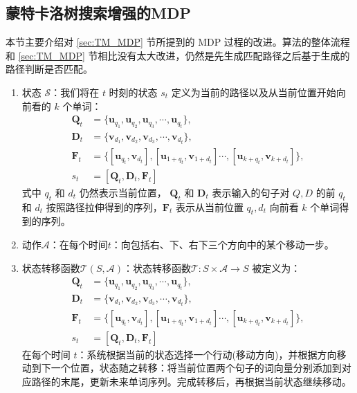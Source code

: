 \subsection{蒙特卡洛树搜索增强的MDP}
本节主要介绍对 \ref{sec:TM_MDP} 节所提到的 MDP 过程的改进。算法的整体流程和 \ref{sec:TM_MDP} 节相比没有太大改进，仍然是先生成匹配路径之后基于生成的路径判断是否匹配。
\begin{enumerate}
	\item 状态 $\mathcal{S}$：我们将在 $t$ 时刻的状态 $s_t$ 定义为当前的路径以及从当前位置开始向前看的 $k$ 个单词：
\begin{equation}
\label{eq:MCTS_state}
\begin{aligned}
\mathbf{Q}_t &= \{\mathbf{u}_{q_1}, \mathbf{u}_{q_2}, \mathbf{u}_{q_3}, \cdots, \mathbf{u}_{q_t}\},\\
\mathbf{D}_t &= \{\mathbf{v}_{d_1}, \mathbf{v}_{d_2}, \mathbf{v}_{d_3},\cdots, \mathbf{v}_{d_t}\},\\
\mathbf{F}_t &= \{[\mathbf{u}_{q_t}, \mathbf{v}_{d_t}], [\mathbf{u}_{1+q_t},\mathbf{v}_{1+d_t}] \cdots, [\mathbf{u}_{k+q_t}, \mathbf{v}_{k+d_t}]\},\\
s_t &= [\mathbf{Q}_t, \mathbf{D}_t, \mathbf{F}_t]
\end{aligned}
\end{equation}
式中 $q_t$ 和 $d_t$ 仍然表示当前位置， $\mathbf{Q}_t$ 和 $\mathbf{D}_t$ 表示输入的句子对 $Q, D$ 的前 $q_t$ 和 $d_t$ 按照路径拉伸得到的序列，$\mathbf{F}_t$ 表示从当前位置 $q_t, d_t$ 向前看 $k$ 个单词得到的序列。

	\item 动作$\mathcal{A}$：在每个时间$t$：向包括右、下、右下三个方向中的某个移动一步。

	\item 状态转移函数$\mathcal{T}(S,\mathcal{A})$：状态转移函数$\mathcal{T}:S\times \mathcal{A}\rightarrow S$ 被定义为：
\begin{equation}
\label{eq:MCTS_translation}
\begin{aligned}
\mathbf{Q}_t &= \{\mathbf{u}_{q_1}, \mathbf{u}_{q_2}, \mathbf{u}_{q_3}, \cdots, \mathbf{u}_{q_t}\},\\
\mathbf{D}_t &= \{\mathbf{v}_{d_1}, \mathbf{v}_{d_2}, \mathbf{v}_{d_3},\cdots, \mathbf{v}_{d_t}\},\\
\mathbf{F}_t &= \{[\mathbf{u}_{q_t}, \mathbf{v}_{d_t}], [\mathbf{u}_{1+q_t},\mathbf{v}_{1+d_t}] \cdots, [\mathbf{u}_{k+q_t}, \mathbf{v}_{k+d_t}]\},\\
s_t &= [\mathbf{Q}_t, \mathbf{D}_t, \mathbf{F}_t]
\end{aligned}
\end{equation}
在每个时间 $t$：系统根据当前的状态选择一个行动(移动方向)，并根据方向移动到下一个位置，状态随之转移：将当前位置两个句子的词向量分别添加到对应路径的末尾，更新未来单词序列。完成转移后，再根据当前状态继续移动。


\end{enumerate}
